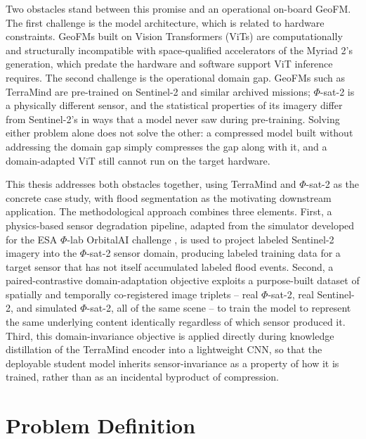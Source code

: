 Two obstacles stand between this promise and an operational on-board GeoFM.
The first challenge is the model architecture, which is related to hardware constraints.
GeoFMs built on Vision Transformers (ViTs)\cite{dosovitskiy2020image} are computationally and structurally incompatible with space-qualified accelerators of the Myriad 2's generation\cite{myriad2}, which predate the hardware and software support ViT inference requires.
The second challenge is the operational domain gap.
GeoFMs such as TerraMind are pre-trained on Sentinel-2 and similar archived missions; $\Phi$-sat-2 is a physically different sensor, and the statistical properties of its imagery differ from Sentinel-2's in ways that a model never saw during pre-training.
Solving either problem alone does not solve the other: a compressed model built without addressing the domain gap simply compresses the gap along with it, and a domain-adapted ViT still cannot run on the target hardware.

This thesis addresses both obstacles together, using TerraMind and $\Phi$-sat-2 as the concrete case study, with flood segmentation as the motivating downstream application.
The methodological approach combines three elements.
First, a physics-based sensor degradation pipeline, adapted from the simulator developed for the ESA $\Phi$-lab OrbitalAI challenge \cite{longepe2024orbitalai}, is used to project labeled Sentinel-2 imagery into the $\Phi$-sat-2 sensor domain, producing labeled training data for a target sensor that has not itself accumulated labeled flood events.
Second, a paired-contrastive domain-adaptation objective exploits a purpose-built dataset of spatially and temporally co-registered image triplets -- real $\Phi$-sat-2, real Sentinel-2, and simulated $\Phi$-sat-2, all of the same scene -- to train the model to represent the same underlying content identically regardless of which sensor produced it.
Third, this domain-invariance objective is applied directly during knowledge distillation\cite{hinton2015distilling} of the TerraMind encoder into a lightweight CNN, so that the deployable student model inherits sensor-invariance as a property of how it is trained, rather than as an incidental byproduct of compression.

\section{Problem Definition}
\label{sec:problem-definition}

